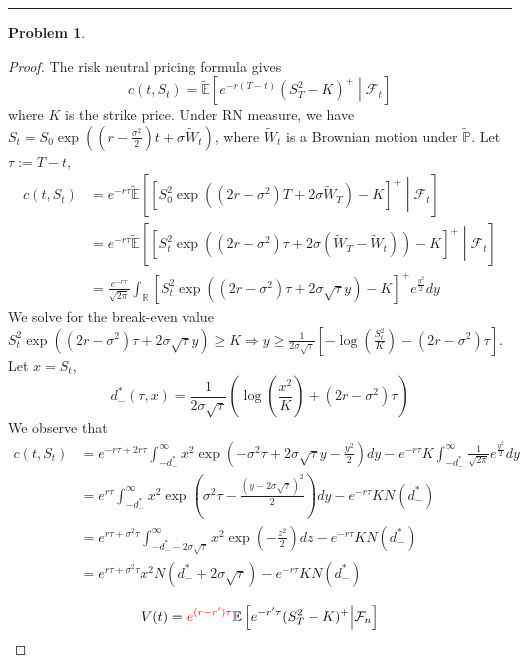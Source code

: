 \documentclass[a4paper, 10pt]{article}
\theoremstyle{definition}
\newtheorem{problem}{Problem}
\theoremstyle{hSol}
\begin{document}
\noindent\rule{16cm}{0.4pt}
\begin{problem}
\end{problem}
\begin{proof} The risk neutral pricing formula gives
\begin{equation}
	c(t,S_t) = \tilde{\mathbb{E}}\left[e^{-r(T-t)}(S_T^2 - K)^+  \middle|\mathcal{F}_t\right] 
\end{equation}
where $K$ is the strike price. Under RN measure, we have $S_t = S_0 \exp\left(\left(r-\frac{\sigma^2}{2}\right)t + \sigma \tilde{W}_t \right)$, where $\tilde{W}_t$ is a Brownian motion under $\tilde{\mathbb{P}}$. Let $\tau := T-t$,
\begin{equation}
	\begin{split}
		c(t,S_t) &=e^{-r\tau} \tilde{\mathbb{E}}\left[\left[S_0^2 \exp\left(\left(2r-\sigma^2\right)T + 2\sigma \tilde{W}_T \right) - K\right]^+  \middle|\mathcal{F}_t\right] \\
		&=e^{-r\tau} \tilde{\mathbb{E}}\left[\left[S_t^2 \exp\left(\left(2r-\sigma^2\right)\tau + 2\sigma (\tilde{W}_T-\tilde{W}_t) \right) - K\right]^+  \middle|\mathcal{F}_t\right] \\
		&= \frac{e^{-r\tau}}{\sqrt{2\pi}} \int_{\mathbb{R}} \left[S_t^2 \exp\left(\left(2r-\sigma^2\right)\tau + 2\sigma \sqrt{\tau}y \right) - K\right]^+ e^{\frac{y^2}{2}}dy
	\end{split}
\end{equation}
We solve for the break-even value $S_t^2 \exp\left(\left(2r-\sigma^2\right)\tau + 2\sigma \sqrt{\tau}y \right) \geq K \Rightarrow y\geq \frac{1}{2\sigma \sqrt{\tau}}[-\log(\frac{S_t^2}{K})-(2r-\sigma^2)\tau]$. Let $x=S_t$, 
$$
d_-^*(\tau, x) = \frac{1}{2\sigma \sqrt{\tau}} \left(\log\left(\frac{x^2}{K}\right)+(2r-\sigma^2)\tau \right)
$$
We observe that 
\begin{equation}
	\begin{split}
		c(t,S_t) &= e^{-r\tau+2r\tau}\int_{-d_-^*}^{\infty} x^2 \exp\left( -\sigma^2 \tau + 2\sigma \sqrt{\tau} y -\frac{y^2}{2}\right)dy - e^{-r\tau}K\int_{-d_-^*}^{\infty} \frac{1}{\sqrt{2\pi}}e^{\frac{y^2}{2}} dy \\
		&= e^{r\tau}\int_{-d_-^*}^{\infty} x^2 \exp\left( \sigma^2 \tau  - \frac{(y-2\sigma \sqrt{\tau})^2}{2}\right)dy - e^{-r\tau}KN(d_-^*) \\
		&= e^{r\tau+\sigma^2\tau}\int_{-d_-^*-2\sigma\sqrt{\tau}}^{\infty} x^2 \exp\left(- \frac{z^2}{2}\right)dz - e^{-r\tau}KN(d_-^*) \\
		&= e^{r\tau+\sigma^2\tau}x^2 N(d_-^*+2\sigma\sqrt{\tau})- e^{-r\tau}KN(d_-^*)
	\end{split}
\end{equation}

\begin{equation}
	V(t) = \textcolor{red}{e^{(r-r')\tau}}\mathbb{E}\left[e^{-r'\tau}(S_T^2 - K)^+ \middle|\mathcal{F}_n\right]
\end{equation}




\end{proof}
\end{document}
